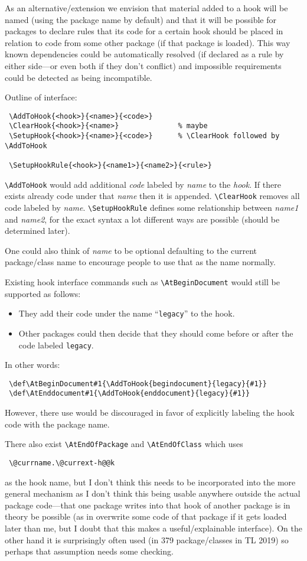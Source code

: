 \documentclass{article}
\newcounter{hook}
\newcommand\cs[1]{\texttt{\textbackslash #1}}
\renewcommand\arg[1]{\textit{#1}}      %
\begin{document}
As an alternative/extension we envision that material added to a hook
will be named (using the package name by default) and that it will be
possible for packages to declare rules that its code for a certain
hook should be placed in relation to code from some other package (if
that package is loaded). This way known dependencies could be
automatically resolved (if declared as a rule by either side---or even
both if they don't conflict) and impossible requirements could be
detected as being incompatible.

Outline of interface:
\begin{verbatim}
 \AddToHook{<hook>}{<name>}{<code>}
 \ClearHook{<hook>}{<name>}              % maybe
 \SetupHook{<hook>}{<name>}{<code>}      % \ClearHook followed by \AddToHook

 \SetupHookRule{<hook>}{<name1>}{<name2>}{<rule>}
\end{verbatim}

\cs{AddToHook} would add additional \arg{code} labeled by \arg{name}
to the \arg{hook}. If there exists already code under that \arg{name}
then it is appended.  \cs{ClearHook} removes all code labeled by
\arg{name}.  \cs{SetupHookRule} defines some relationship between
\arg{name1} and \arg{name2}, for the exact syntax a lot different ways
are possible (should be determined later).

One could also think of \arg{name} to be optional defaulting to the
current package/class name to encourage people to use that as the name
normally.


Existing hook interface commands such as \cs{AtBeginDocument} would
still be supported as follows:
\begin{itemize}
\item
  They add their code under the name ``\texttt{legacy}'' to the hook.
\item
  Other packages could then decide that they should come before or
  after the code labeled \texttt{legacy}.
\end{itemize}
In other words:
\begin{verbatim}
 \def\AtBeginDocument#1{\AddToHook{begindocument}{legacy}{#1}}
 \def\AtEnddocument#1{\AddToHook{enddocument}{legacy}{#1}}
\end{verbatim}

However, there use would be discouraged in favor of explicitly
labeling the hook code with the package name.

There also exist \cs{AtEndOfPackage} and \cs{AtEndOfClass} which uses
\begin{verbatim}
 \@currname.\@currext-h@@k
\end{verbatim}
as the hook name, but I don't think
this needs to be incorporated into the more general mechanism as I
don't think this being usable anywhere outside the actual package
code---that one package writes into that hook of another package is in
theory be possible (as in overwrite some code of that package if it
gets loaded later than me, but I doubt that this makes a
useful/explainable interface).  On the other hand it is surprisingly
often used (in 379 package/classes in TL 2019) so perhaps that
assumption needs some checking.
\end{document}
